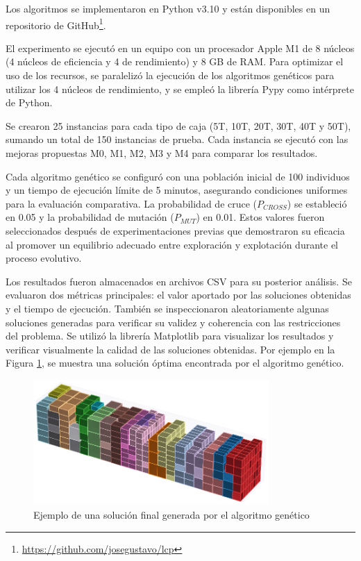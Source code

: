 Los algoritmos se implementaron en Python v3.10 y están disponibles en un repositorio de GitHub\footnote{\url{https://github.com/josegustavo/lcp}}.

El experimento se ejecutó en un equipo con un procesador Apple M1 de 8 núcleos (4 núcleos de eficiencia y 4 de rendimiento) y 8 GB de RAM. Para optimizar el uso de los recursos, se paralelizó la ejecución de los algoritmos genéticos para utilizar los 4 núcleos de rendimiento, y se empleó la librería Pypy como intérprete de Python.

Se crearon 25 instancias para cada tipo de caja (5T, 10T, 20T, 30T, 40T y 50T), sumando un total de 150 instancias de prueba. Cada instancia se ejecutó con las mejoras propuestas M0, M1, M2, M3 y M4 para comparar los resultados.

Cada algoritmo genético se configuró con una población inicial de 100 individuos y un tiempo de ejecución límite de 5 minutos, asegurando condiciones uniformes para la evaluación comparativa. La probabilidad de cruce ($P_{CROSS}$) se estableció en 0.05 y la probabilidad de mutación ($P_{MUT}$) en 0.01. Estos valores fueron seleccionados después de experimentaciones previas que demostraron su eficacia al promover un equilibrio adecuado entre exploración y explotación durante el proceso evolutivo.

Los resultados fueron almacenados en archivos CSV para su posterior análisis. Se evaluaron dos métricas principales: el valor aportado por las soluciones obtenidas y el tiempo de ejecución. También se inspeccionaron aleatoriamente algunas soluciones generadas para verificar su validez y coherencia con las restricciones del problema. Se utilizó la librería Matplotlib para visualizar los resultados y verificar visualmente la calidad de las soluciones obtenidas. Por ejemplo en la Figura \ref{fig:ejemplo_solucion}, se muestra una solución óptima encontrada por el algoritmo genético.

\begin{figure}[H]
    \centering
    \includegraphics[width=0.8\textwidth]{Figures/ejemplo_solucion.eps}
    \caption{Ejemplo de una solución final generada por el algoritmo genético}
    \label{fig:ejemplo_solucion}
\end{figure}

